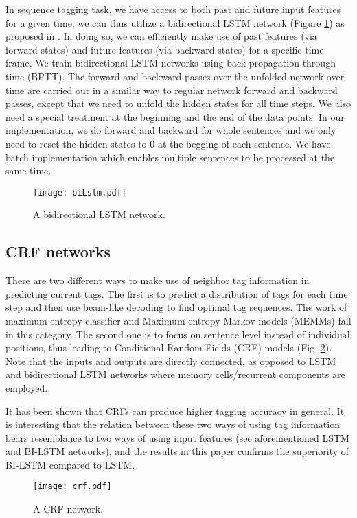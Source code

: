 \documentclass[11pt,a4paper]{article}
\begin{document}
In sequence tagging task, we have access to both past and future input features for a given time, we can thus utilize a bidirectional LSTM network (Figure \ref{fig:biLstm}) as proposed in \cite{graves3}.  In doing so, we can efficiently make use of past features (via forward states) and future features (via backward states) for a specific time frame. We train bidirectional LSTM networks using back-propagation through time (BPTT)\cite{boden1}. The forward and backward passes over the unfolded network over time are carried out in a similar way to regular network forward and backward passes, except that we need to unfold the hidden states for all time steps.  We also need a special treatment at the beginning and the end of the data points. In our implementation, we do forward and backward for whole sentences and we only need to reset the hidden states to 0 at the begging of each sentence. We have batch implementation which enables multiple sentences to be processed at the same time.  

\begin{figure}[!htb]
	\centering
		\texttt{[image: biLstm.pdf]}
	\caption{A bidirectional LSTM network.}
	\label{fig:biLstm}
\end{figure} 

\subsection{CRF networks}
There are two different ways to make use of neighbor tag information in predicting current tags.  The first is to predict a distribution of tags for each time step and then use beam-like decoding to find optimal tag sequences. The work of maximum entropy classifier \cite{ratnaparkhi1} and Maximum entropy Markov models (MEMMs) \cite{mcCallum1} fall in this category. The second one is to focus on sentence level instead of individual positions, thus leading to Conditional Random Fields (CRF) models \cite{lafferty1} (Fig. \ref{fig:crf}). Note that the inputs and outputs are directly connected, as opposed to LSTM and  bidirectional LSTM networks where memory cells/recurrent components are employed.

It has been shown that CRFs can produce higher tagging accuracy in general. It is interesting that the relation between these two ways of using tag information bears resemblance to two ways of using input features (see aforementioned LSTM and BI-LSTM networks), and the results in this paper confirms the superiority of BI-LSTM compared to LSTM.
\begin{figure}[htb]
	\centering
		\texttt{[image: crf.pdf]}
	\caption{A CRF network.}
	\label{fig:crf}
\end{figure} 
\end{document}
